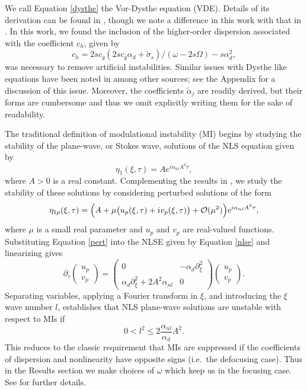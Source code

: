 \documentclass[a4paper,11pt]{article}
\newcommand{\bp}{\begin{pmatrix}}
\newcommand{\ep}{\end{pmatrix}}
\newcommand{\pd}{\partial}
\begin{document}
We call Equation \eqref{dysthe} the Vor-Dysthe equation (VDE).  Details of its derivation can be found in \cite{curtis8}, though we note a difference in this work with that in \cite{curtis8}.  In this work, we found the inclusion of the higher-order dispersion associated with the coefficient $c_{h}$, given by
\[
c_{h} = 2sc_{g}(2sc_{g}\alpha_{d}+\tilde{\sigma}_{s})/(\omega-2s\Omega) - s\alpha_{d}^{2},
\]
was necessary to remove artificial instabilities.  Similar issues with Dysthe like equations have been noted in \cite{eeltink} among other sources; see the Appendix for a discussion of this issue.  Moreover, the coefficients $\tilde{\alpha}_{j}$ are readily derived, but their forms are cumbersome and thus we omit explicitly writing them for the sake of readability.  

The traditional definition of modulational instability (MI) begins by studying the stability of the plane-wave, or Stokes wave, solutions of the NLS equation given by
\[
\eta_{1}(\xi,\tau) = A e^{i\alpha_{nl}A^{2}\tau},
\]
where $A>0$ is a real constant.  Complementing the results in \cite{thomas2012nonlinear}, we study the stability of these solutions by considering perturbed solutions of the form
\begin{equation}
\eta_{1p}(\xi,\tau) = \Big{(}A +\mu \big{(}u_{p}(\xi,\tau)+iv_{p}(\xi,\tau)\big{)} +\mathcal{O}(\mu^2)\Big{)}\mbox{e}^{i\alpha_{nl}A^{2}\tau},
\label{pert}
\end{equation}
where $\mu$ is a small real parameter and $u_{p}$ and $v_{p}$ are real-valued functions.  Substituting Equation \eqref{pert} into the NLSE given by Equation \eqref{nlse} and linearizing gives
\[
\pd_{\tau}\bp u_{p}\\ v_{p}\ep = \bp 0 & -\alpha_{d}\pd_{\xi}^{2} \\ \alpha_{d}\pd_{\xi}^{2} + 2A^{2}\alpha_{nl} & 0 \ep \bp u_{p} \\ v_{p} \ep.
\]
Separating variables, applying a Fourier transform in $\xi$, and introducing the $\xi$ wave number $l$, establishes that NLS plane-wave solutions are unstable with respect to MIs if
\[
0 < l^{2} \leq 2\frac{\alpha_{nl}}{\alpha_{d}}A^{2}.
\]
This reduces to the classic requirement that MIs are suppressed if the coefficients of dispersion and nonlinearity have opposite signs (i.e.~the defocusing case).  Thus in the Results section we make choices of $\omega$ which keep us in the focusing case.  See \cite{curtis8} for further details.  
\end{document}
